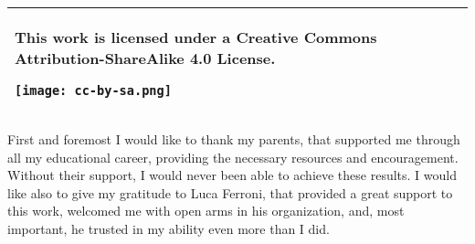 \documentclass[a4paper,singleside,11pt]{report}
\begin{document}



\copertinatesi 
\begin{tabular}{|p{}|}
 \hline
 This work is licensed under a Creative Commons Attribution-ShareAlike 4.0 License.
 \begin{center}
 \texttt{[image: cc-by-sa.png]}
 \end{center}\\
 \hline
 \end{tabular}
\indice
\indicefigure
\indicetabelle
\iniziatesto









\appendix



\ringraziamenti

First and foremost I would like to thank my parents, that supported me through
all my educational career, providing the necessary resources and encouragement.
Without their support, I would never been able to achieve these results. I would
like also to give my gratitude to Luca Ferroni, that provided a great support to
this work, welcomed me with open arms in his organization, and, most important,
he trusted in my ability even more than I did.
\end{document}
